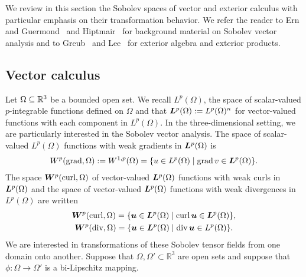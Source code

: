 \documentclass[10pt,a4paper]{article}
\newcommand\cye[1]{%
\protect\leavevmode
\begingroup
    \color{blue}%
    #1%
\endgroup
}
\begin{document}
We review in this section the Sobolev spaces of vector and exterior calculus with particular emphasis on their transformation behavior. 
We refer the reader to Ern and Guermond~\cite{ern2021finite} and Hiptmair~\cite{hiptmair2002finite} for background material on Sobolev vector analysis and to Greub~\cite{greub1967multilinear} and Lee~\cite{lee2012smooth} for exterior algebra and exterior products. 

\subsection{Vector calculus}

Let $\Omega \subseteq {\mathbb R}^{3}$ be a bounded open set. 
We recall $L^{p}(\Omega)$, the space of scalar-valued $p$-integrable functions defined on $\Omega$
and that $\bm{L}^{p}(\Omega) := L^{p}(\Omega)^{n}$ for vector-valued functions with each component in $L^{p}(\Omega)$. 
In the three-dimensional setting, we are particularly interested in the Sobolev vector analysis. 
The space of scalar-valued $L^{p}(\Omega)$ functions with weak gradients in $\bm{L}^{p}(\Omega)$ is 
\begin{gather*}
    W^{p}(\grad,\Omega) := W^{1,p}(\Omega) = \{ u \in L^{p}(\Omega) \suchthat \grad v \in \bfL^{p}(\Omega) \}
    .
\end{gather*}
The space $\bm{W}^{p}(\operatorname{curl},\Omega)$ of vector-valued $\bm{L}^{p}(\Omega)$ functions with weak curls in $\bm{L}^{p}(\Omega)$
and the space of vector-valued $\bm{L}^{p}(\Omega)$ functions with weak divergences in $L^{p}(\Omega)$ are written 
\begin{gather*}
    \bfW^{p}(\curl,\Omega) = \{ \bfu \in \bfL^{p}(\Omega) \suchthat \curl \bfu \in \bfL^{p}(\Omega) \},
    \\ 
    \bfW^{p}(\divergence,\Omega) = \{ \bfu \in \bfL^{p}(\Omega) \suchthat \divergence \bfu \in L^{p}(\Omega) \}.
\end{gather*}
We are interested in transformations of these Sobolev tensor fields from one domain onto another. 
Suppose that $\Omega, \Omega' \subset \mathbb{R}^3$ are open sets and suppose that $\phi: \Omega \to \Omega'$ is a bi-Lipschitz mapping.
\end{document}
